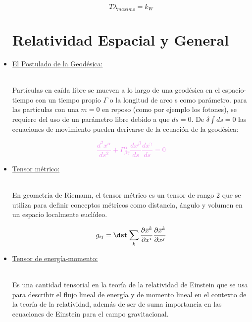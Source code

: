 \documentclass[letterpaper,12pt]{article}
\begin{document}
\begin{itemize}
{    $$T\lambda_{maximo}=k_W$$  
    
    }
    
    \pagestyle{fancy}

    \fancyhf{}
    \rfoot{\thepage}
    
\section{\Large{Relatividad Espacial y General}}

    \item[\clubsuit]\large{\underline{El Postulado de la Geodésica:}}\\\\
    \small{Partículas en caída libre se mueven a lo largo de una geodésica en el espacio-tiempo con un tiempo propio $\varGamma$ o la longitud de arco s como parámetro. para las partículas con una $m=0$ en reposo (como por ejemplo los fotones), se requiere del uso de un parámetro libre debido a que $ds=0$. De $\delta\int ds=0$ las ecuaciones de movimiento pueden derivarse de la ecuación de la geodésica:


    \textcolor{violet}{$$\frac{d^2 x^\alpha}{ds^2}+\varGamma_{\beta\gamma}^\alpha\frac{dx^\beta}{ds}\frac{dx^\gamma}{ds}=0$$}  
    
    }

    \item[\clubsuit]\large{\underline{Tensor métrico:}}\\\\
    \small{En geometría de Riemann, el tensor métrico es un tensor de rango 2 que se utiliza para definir conceptos métricos como distancia, ángulo y volumen en un espacio localmente euclídeo.


    $$g_{ij}=\dst\sum_{k}\frac{\partial\bar{x}^k}{\partial x^i}\frac{\partial\bar{x}^k}{\partial x^j}$$  
    
    }
    
    \item[\clubsuit]\large{\underline{Tensor de energía-momento:}}\\\\
    \small{Es una cantidad tensorial en la teoría de la relatividad de Einstein que se usa para describir el flujo lineal de energía y de momento lineal en el contexto de la teoría de la relatividad, además de ser de suma importancia en las ecuaciones de Einstein para el campo gravitacional.


}
\end{itemize}
\end{document}

